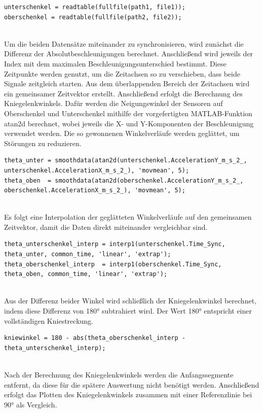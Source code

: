 \begin{lstlisting}[style=Matlab-editor]
unterschenkel = readtable(fullfile(path1, file1));
oberschenkel = readtable(fullfile(path2, file2));
\end{lstlisting}
\\
\noindent Um die beiden Datensätze miteinander zu synchronisieren, wird zunächst die Differenz der Absolutbeschleunigungen berechnet. Anschließend wird jeweils der Index mit dem maximalen Beschleunigungsunterschied bestimmt. Diese Zeitpunkte werden genutzt, um die Zeitachsen so zu verschieben, dass beide Signale zeitgleich starten.
\noindent Aus dem überlappenden Bereich der Zeitachsen wird ein gemeinsamer Zeitvektor erstellt. Anschließend erfolgt die Berechnung des Kniegelenkwinkels. Dafür werden die Neigungswinkel der Sensoren auf Oberschenkel und Unterschenkel mithilfe der vorgefertigten MATLAB-Funktion atan2d berechnet, wobei jeweils die X- und Y-Komponenten der Beschleunigung verwendet werden. Die so gewonnenen Winkelverläufe werden geglättet, um Störungen zu reduzieren.
\begin{lstlisting}[style=Matlab-editor]
theta_unter = smoothdata(atan2d(unterschenkel.AccelerationY_m_s_2_, unterschenkel.AccelerationX_m_s_2_), 'movmean', 5);
theta_oben  = smoothdata(atan2d(oberschenkel.AccelerationY_m_s_2_, oberschenkel.AccelerationX_m_s_2_), 'movmean', 5);
\end{lstlisting}
\\
\noindent Es folgt eine Interpolation der geglätteten Winkelverläufe auf den gemeinsamen Zeitvektor, damit die Daten direkt miteinander vergleichbar sind. 
\begin{lstlisting}[style=Matlab-editor]
theta_unterschenkel_interp = interp1(unterschenkel.Time_Sync, theta_unter, common_time, 'linear', 'extrap');
theta_oberschenkel_interp  = interp1(oberschenkel.Time_Sync, theta_oben, common_time, 'linear', 'extrap');
\end{lstlisting}
\\
\noindent Aus der Differenz beider Winkel wird schließlich der Kniegelenkwinkel berechnet, indem diese Differenz von 180° subtrahiert wird. Der Wert 180° entspricht einer vollständigen Kniestreckung.
\begin{lstlisting}[style=Matlab-editor]
kniewinkel = 180 - abs(theta_oberschenkel_interp - theta_unterschenkel_interp);
\end{lstlisting}
\\
\noindent Nach der Berechnung des Kniegelenkwinkels werden die Anfangssegmente entfernt, da diese für die spätere Auswertung nicht benötigt werden. Anschließend erfolgt das Plotten des Kniegelenkwinkels zusammen mit einer Referenzlinie bei 90° als Vergleich.

